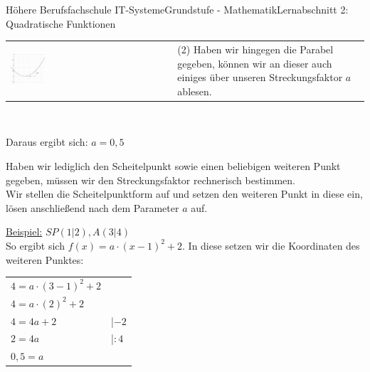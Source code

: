\documentclass[11pt,twocolumn,oneside,openany,headings=optiontotoc,11pt,numbers=noenddot]{article}
\begin{document}
\begin{worksheet}{Höhere Berufsfachschule IT-Systeme}{Grundstufe - Mathematik}{Lernabschnitt 2: Quadratische Funktionen}
\begin{tabularx}{0.5\textwidth}{XX}
			\includegraphics[width=0.22\textwidth, align=t]{../99_Bilder/a_graph.png} & (2) Haben wir hingegen die Parabel gegeben, können wir an dieser auch einiges über unseren Streckungsfaktor \(a\) ablesen.
		\end{tabularx}\\
		\par\noindent
		Daraus ergibt sich: \(a = 0,5\)\\
		\par\bigskip\noindent
		Haben wir lediglich den Scheitelpunkt sowie einen beliebigen weiteren Punkt gegeben, müssen wir den Streckungsfaktor rechnerisch bestimmen.\\
		Wir stellen die Scheitelpunktform auf und setzen den weiteren Punkt in diese ein, lösen anschließend nach dem Parameter \(a\) auf.\\
		\par\bigskip\noindent
		\underline{Beispiel:} \(SP(1|2), A(3|4)\)\\
		So ergibt sich \(f(x) = a\cdot(x-1)^2+2\). In diese setzen wir die Koordinaten des weiteren Punktes:\\
		\begin{tabularx}{0.5\textwidth}{ll}
			\(4 = a\cdot(3-1)^2 +2\)\\
			\(4 = a\cdot(2)^2 + 2\)\\
			\(4 = 4a +2\) & |\(-2\)\\
			\(2 = 4a\) & |\(:4\)\\
			\(0,5 = a\)
		\end{tabularx}

\end{worksheet}
\end{document}
